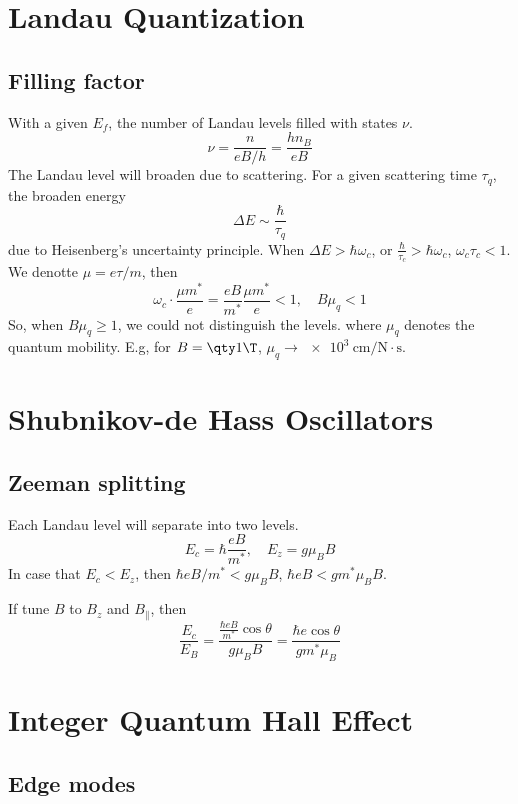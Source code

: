 \section{Landau Quantization}

\subsection{Filling factor}

With a given $E_f$, the number of Landau levels filled with states $\nu$.
\begin{equation}
  \nu = \frac{n}{eB/h} = \frac{hn_B}{eB}
\end{equation}
The Landau level will broaden due to scattering.
For a given scattering time $\tau_q$, the broaden energy
\[
  \Delta E \sim \frac\hbar{\tau_q}
\]
due to Heisenberg's uncertainty principle.
When $\Delta E > \hbar\omega_c$, or $\frac\hbar{\tau_c} > \hbar\omega_c$,
$\omega_c\tau_c < 1$. We denotte $\mu = e\tau/m$, then
\[
  \omega_c \cdot \frac{\mu m^*}{e} = \frac{eB}{m^*} \frac{\mu m^*}{e} < 1,
  \quad B \mu_q < 1
\]
So, when $B\mu_q \geq 1$, we could not distinguish the levels.
where $\mu_q$ denotes the quantum mobility. E.g, for
$B = \qty 1\T$, $\mu_q \to \qty{e3}{\cm/\N\cdot\s}$.

\section{Shubnikov-de Hass Oscillators}

\subsection{Zeeman splitting}

Each Landau level will separate into two levels.
\[
  E_c = \hbar \frac{eB}{m^*}, \quad E_z = g\mu_B B
\]
In case that $E_c < E_z$, then $\hbar eB/m^* < g\mu_B B$,
$\hbar eB < gm^*\mu_B B$.

If tune $B$ to $B_z$ and $B_\parallel$, then
\[
  \frac{E_c}{E_B} = \frac{\frac{\hbar eB}{m^*}\cos\theta}{g\mu_B B}
= \frac{\hbar e\cos\theta}{gm^*\mu_B}
\]

\section{Integer Quantum Hall Effect}

\subsection{Edge modes}

